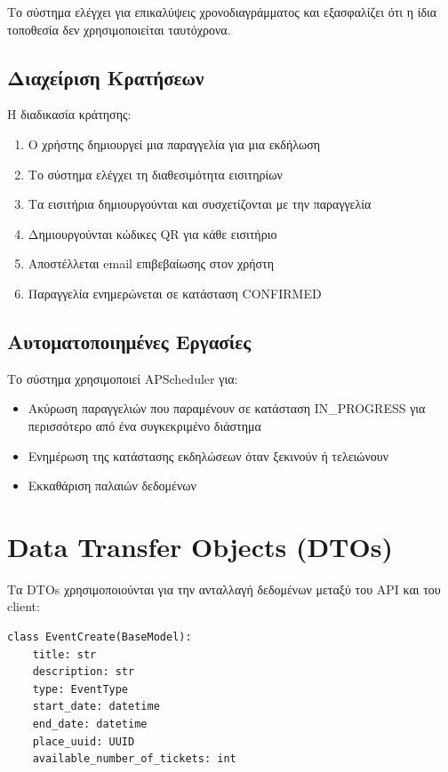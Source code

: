 \documentclass[12pt,a4paper]{report}
\begin{document}
Το σύστημα ελέγχει για επικαλύψεις χρονοδιαγράμματος και εξασφαλίζει ότι η ίδια τοποθεσία δεν χρησιμοποιείται ταυτόχρονα.

\subsection{Διαχείριση Κρατήσεων}

Η διαδικασία κράτησης:
\begin{enumerate}
    \item Ο χρήστης δημιουργεί μια παραγγελία για μια εκδήλωση
    \item Το σύστημα ελέγχει τη διαθεσιμότητα εισιτηρίων
    \item Τα εισιτήρια δημιουργούνται και συσχετίζονται με την παραγγελία
    \item Δημιουργούνται κώδικες QR για κάθε εισιτήριο
    \item Αποστέλλεται email επιβεβαίωσης στον χρήστη
    \item Παραγγελία ενημερώνεται σε κατάσταση CONFIRMED
\end{enumerate}

\subsection{Αυτοματοποιημένες Εργασίες}

Το σύστημα χρησιμοποιεί APScheduler για:
\begin{itemize}
    \item Ακύρωση παραγγελιών που παραμένουν σε κατάσταση IN\_PROGRESS για περισσότερο από ένα συγκεκριμένο διάστημα
    \item Ενημέρωση της κατάστασης εκδηλώσεων όταν ξεκινούν ή τελειώνουν
    \item Εκκαθάριση παλαιών δεδομένων
\end{itemize}

\section{Data Transfer Objects (DTOs)}

Τα DTOs χρησιμοποιούνται για την ανταλλαγή δεδομένων μεταξύ του API και του client:

\begin{lstlisting}[caption=Παράδειγμα DTO]
class EventCreate(BaseModel):
    title: str
    description: str
    type: EventType
    start_date: datetime
    end_date: datetime
    place_uuid: UUID
    available_number_of_tickets: int
\end{lstlisting}
\end{document}
